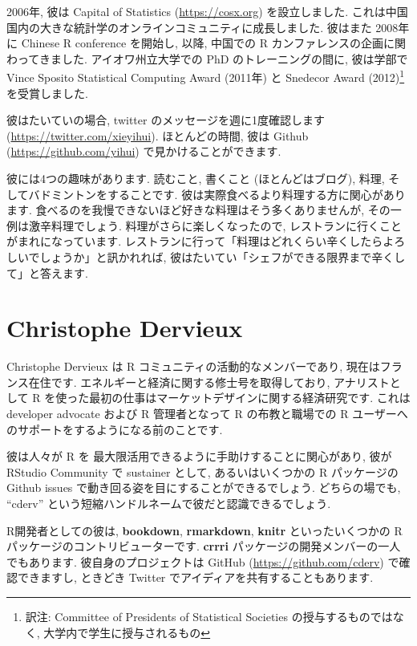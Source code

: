 \documentclass[
  11pt,
  lualatex,ja=standard,jafont=noto]{bxjsreport}
\begin{document}
2006年, 彼は Capital of Statistics (\url{https://cosx.org}) を設立しました. これは中国国内の大きな統計学のオンラインコミュニティに成長しました. 彼はまた 2008年に Chinese R conference を開始し, 以降, 中国での R カンファレンスの企画に関わってきました. アイオワ州立大学での PhD のトレーニングの間に, 彼は学部で Vince Sposito Statistical Computing Award (2011年) と Snedecor Award (2012)\footnote{訳注: Committee of Presidents of Statistical Societies の授与するものではなく, 大学内で学生に授与されるもの}を受賞しました.

彼はたいていの場合, twitter のメッセージを週に1度確認します (\url{https://twitter.com/xieyihui}). ほとんどの時間, 彼は Github (\url{https://github.com/yihui}) で見かけることができます.

彼には4つの趣味があります. 読むこと, 書くこと (ほとんどはブログ), 料理, そしてバドミントンをすることです. 彼は実際食べるより料理する方に関心があります. 食べるのを我慢できないほど好きな料理はそう多くありませんが, その一例は激辛料理でしょう. 料理がさらに楽しくなったので, レストランに行くことがまれになっています. レストランに行って「料理はどれくらい辛くしたらよろしいでしょうか」と訊かれれば, 彼はたいてい「シェフができる限界まで辛くして」と答えます.

\hypertarget{christophe-dervieux}{%
\section*{Christophe Dervieux}\label{christophe-dervieux}}

Christophe Dervieux は R コミュニティの活動的なメンバーであり, 現在はフランス在住です. エネルギーと経済に関する修士号を取得しており, アナリストとして R を使った最初の仕事はマーケットデザインに関する経済研究です. これは developer advocate および R 管理者となって R の布教と職場での R ユーザーへのサポートをするようになる前のことです.

彼は人々が R を 最大限活用できるように手助けすることに関心があり, 彼が RStudio Community で sustainer として, あるいはいくつかの R パッケージの Github issues で動き回る姿を目にすることができるでしょう. どちらの場でも, ``cderv'' という短縮ハンドルネームで彼だと認識できるでしょう.

R開発者としての彼は, \textbf{bookdown}, \textbf{rmarkdown}, \textbf{knitr} といったいくつかの R パッケージのコントリビューターです. \textbf{crrri} パッケージの開発メンバーの一人でもあります. 彼自身のプロジェクトは GitHub (\url{https://github.com/cderv}) で確認できますし, ときどき Twitter でアイディアを共有することもあります.
\end{document}

